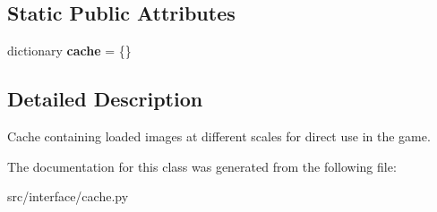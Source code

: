 \subsection*{\-Static \-Public \-Attributes}
\begin{DoxyCompactItemize}
\item 
\hypertarget{classinterface_1_1cache_1_1_image_cache_afa394e30aa08b02c7ead02a0f9dd448c}{dictionary {\bfseries cache} = \{\}}\label{classinterface_1_1cache_1_1_image_cache_afa394e30aa08b02c7ead02a0f9dd448c}

\end{DoxyCompactItemize}


\subsection{\-Detailed \-Description}
\begin{DoxyVerb}
Cache containing loaded images at different scales for direct use
in the game.
\end{DoxyVerb}
 

\-The documentation for this class was generated from the following file\-:\begin{DoxyCompactItemize}
\item 
src/interface/cache.\-py\end{DoxyCompactItemize}
